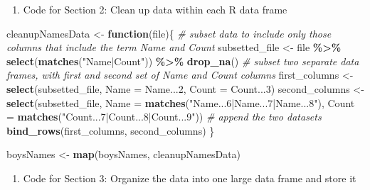\documentclass[
]{book}
\newenvironment{Shaded}{\begin{snugshade}}{\end{snugshade}}
\newcommand{\CommentTok}[1]{\textcolor[rgb]{0.56,0.35,0.01}{\textit{#1}}}
\newcommand{\ControlFlowTok}[1]{\textcolor[rgb]{0.13,0.29,0.53}{\textbf{#1}}}
\newcommand{\DataTypeTok}[1]{\textcolor[rgb]{0.13,0.29,0.53}{#1}}
\newcommand{\DecValTok}[1]{\textcolor[rgb]{0.00,0.00,0.81}{#1}}
\newcommand{\KeywordTok}[1]{\textcolor[rgb]{0.13,0.29,0.53}{\textbf{#1}}}
\newcommand{\NormalTok}[1]{#1}
\newcommand{\OperatorTok}[1]{\textcolor[rgb]{0.81,0.36,0.00}{\textbf{#1}}}
\newcommand{\StringTok}[1]{\textcolor[rgb]{0.31,0.60,0.02}{#1}}
\providecommand{\tightlist}{%
  \setlength{\itemsep}{0pt}\setlength{\parskip}{0pt}}
\begin{document}
\begin{enumerate}
\def\labelenumi{\arabic{enumi}.}
\setcounter{enumi}{1}
\tightlist
\item
  Code for Section 2: Clean up data within each R data frame
\end{enumerate}

\begin{Shaded}
\begin{Highlighting}[]
\NormalTok{cleanupNamesData \textless{}{-}}\StringTok{ }\ControlFlowTok{function}\NormalTok{(file)\{}
  \CommentTok{\# subset data to include only those columns that include the term \textasciigrave{}Name\textasciigrave{} and \textasciigrave{}Count\textasciigrave{}}
\NormalTok{  subsetted\_file \textless{}{-}}\StringTok{ }\NormalTok{file }\OperatorTok{\%\textgreater{}\%}
\StringTok{    }\KeywordTok{select}\NormalTok{(}\KeywordTok{matches}\NormalTok{(}\StringTok{"Name|Count"}\NormalTok{)) }\OperatorTok{\%\textgreater{}\%}
\StringTok{    }\KeywordTok{drop\_na}\NormalTok{()}
  \CommentTok{\# subset two separate data frames, with first and second set of \textasciigrave{}Name\textasciigrave{} and \textasciigrave{}Count\textasciigrave{} columns }
\NormalTok{  first\_columns \textless{}{-}}\StringTok{ }\KeywordTok{select}\NormalTok{(subsetted\_file, }\DataTypeTok{Name =}\NormalTok{ Name...}\DecValTok{2}\NormalTok{, }\DataTypeTok{Count =}\NormalTok{ Count...}\DecValTok{3}\NormalTok{) }
\NormalTok{  second\_columns \textless{}{-}}\StringTok{ }\KeywordTok{select}\NormalTok{(subsetted\_file, }\DataTypeTok{Name =} \KeywordTok{matches}\NormalTok{(}\StringTok{"Name...6|Name...7|Name...8"}\NormalTok{),}
                                           \DataTypeTok{Count =} \KeywordTok{matches}\NormalTok{(}\StringTok{"Count...7|Count...8|Count...9"}\NormalTok{))}
  \CommentTok{\# append the two datasets}
  \KeywordTok{bind\_rows}\NormalTok{(first\_columns, second\_columns)}
\NormalTok{\}}

\NormalTok{boysNames \textless{}{-}}\StringTok{ }\KeywordTok{map}\NormalTok{(boysNames, cleanupNamesData)}
\end{Highlighting}
\end{Shaded}

\begin{enumerate}
\def\labelenumi{\arabic{enumi}.}
\setcounter{enumi}{2}
\tightlist
\item
  Code for Section 3: Organize the data into one large data frame and store it
\end{enumerate}
\end{document}
